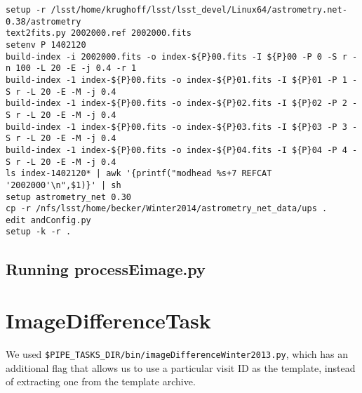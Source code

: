 \documentclass[prd, nofootinbib, floatfix, 11pt, tightenlines, times]{article}
\begin{document}
\begin{appendices}
\small{
\begin{verbatim}
setup -r /lsst/home/krughoff/lsst/lsst_devel/Linux64/astrometry.net-0.38/astrometry
text2fits.py 2002000.ref 2002000.fits
setenv P 1402120
build-index -i 2002000.fits -o index-${P}00.fits -I ${P}00 -P 0 -S r -n 100 -L 20 -E -j 0.4 -r 1
build-index -1 index-${P}00.fits -o index-${P}01.fits -I ${P}01 -P 1 -S r -L 20 -E -M -j 0.4 
build-index -1 index-${P}00.fits -o index-${P}02.fits -I ${P}02 -P 2 -S r -L 20 -E -M -j 0.4 
build-index -1 index-${P}00.fits -o index-${P}03.fits -I ${P}03 -P 3 -S r -L 20 -E -M -j 0.4 
build-index -1 index-${P}00.fits -o index-${P}04.fits -I ${P}04 -P 4 -S r -L 20 -E -M -j 0.4 
ls index-1402120* | awk '{printf("modhead %s+7 REFCAT '2002000'\n",$1)}' | sh     
setup astrometry_net 0.30  
cp -r /nfs/lsst/home/becker/Winter2014/astrometry_net_data/ups .
edit andConfig.py 
setup -k -r .
\end{verbatim}
}

\subsection{Running processEimage.py}

\section{ImageDifferenceTask}


We used {\tt \$PIPE\_TASKS\_DIR/bin/imageDifferenceWinter2013.py},
which has an additional flag that allows us to use a particular visit
ID as the template, instead of extracting one from the template
archive.

\end{appendices}
\end{document}
